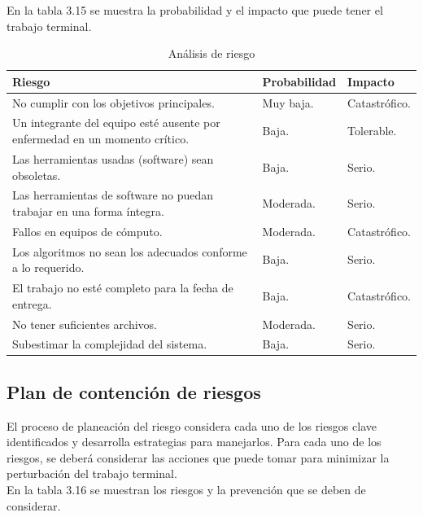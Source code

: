 \documentclass[12pt]{report}
\begin{document}
En la tabla 3.15 se muestra la probabilidad y el impacto que puede tener el trabajo terminal.\\

\begin{table}[H]
\begin{center}
\begin{tabular}{|p{60mm}|p{25mm}|p{25mm}|}
\hline
 Riesgo & Probabilidad & Impacto \\
\hline \hline 
No cumplir con los objetivos principales. & Muy baja. & Catastrófico.\\
\hline
Un integrante del equipo esté ausente por enfermedad en un momento crítico. & Baja. & Tolerable.\\
\hline
Las herramientas usadas (software) sean obsoletas. & Baja. & Serio.\\
\hline
Las herramientas de software no puedan trabajar en una forma íntegra. & Moderada. & Serio.\\
\hline
Fallos en equipos de cómputo. & Moderada. & Catastrófico.\\
\hline
Los algoritmos no sean los adecuados conforme a lo requerido. & Baja. & Serio. \\
\hline
El trabajo no esté completo para la fecha de entrega. & Baja. & Catastrófico.\\
\hline
No tener suficientes archivos. & Moderada. & Serio.\\
\hline
Subestimar la complejidad del sistema. & Baja. & Serio.\\
\hline
\end{tabular}
\caption{Análisis de riesgo}
\end{center}
\end{table}

\subsection{Plan de contención de riesgos}
El proceso de planeación del riesgo considera cada uno de los riesgos clave identificados y desarrolla estrategias para manejarlos. Para cada uno de los riesgos, se deberá considerar las acciones que puede tomar para minimizar la perturbación del trabajo terminal.\\

En la tabla 3.16 se muestran los riesgos y la prevención que se deben de considerar.
\end{document}

